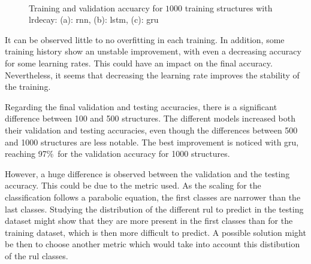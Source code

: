 \documentclass[conference]{IEEEtran}
\begin{document}
\begin{figure}[htp]
	\centering
	\quad
	\\
	\caption{Training and validation accuarcy for $ 1000 $ training structures with \gls{lrdecay}: (a): \gls{rnn}, (b): \gls{lstm}, (c): \gls{gru}}
	\label{fig:accuracy_1000_structures_fine_tuning_rnn}
\end{figure}

It can be observed little to no overfitting in each training. In addition, some training history show an unstable improvement, with even a decreasing accuracy for some learning rates. This could have an impact on the final accuracy. Nevertheless, it seems that decreasing the learning rate improves the stability of the training.

Regarding the final validation and testing accuracies, there is a significant difference between 100 and 500 structures. The different models increased both their validation and testing accuracies, even though the differences between 500 and 1000 structures are less notable. The best improvement is noticed with \gls{gru}, reaching 97\%\ for the validation accuracy for 1000 structures.

However, a huge difference is observed between the validation and the testing accuracy. This could be due to the metric used. As the scaling for the classification follows a parabolic equation, the first classes are narrower than the last classes. Studying the distribution of the different \gls{rul} to predict in the testing dataset might show that they are more present in the first classes than for the training dataset, which is then more difficult to predict. A possible solution might be then to choose another metric which would take into account this distibution of the \gls{rul} classes.
\end{document}
